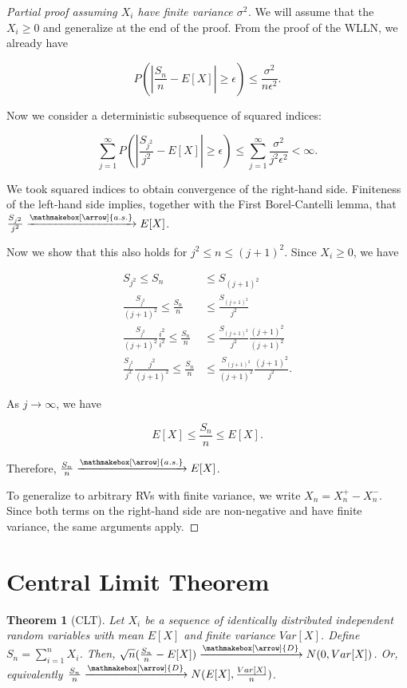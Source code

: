 \documentclass{book}
\theoremstyle{plain}%
\newtheorem{theorem}{Theorem}[section]
\theoremstyle{definition}
\newlength{\arrow}
\newcommand*{\myrightarrow}[1]{\xrightarrow{\mathmakebox[\arrow]{#1}}}
\begin{document}
\begin{proof}[Partial proof assuming $X_i$ have finite variance $\sigma^2$] We will assume that the $X_i \geq 0$ and generalize at the end of the proof. From the proof of the WLLN, we already have

$$P(|\frac{S_n}{n} - E[X]| \geq \epsilon) \leq  \frac{\sigma^2}{n\epsilon^2}.$$

Now we consider a deterministic subsequence of squared indices:

$$\sum_{j=1}^\infty P(|\frac{S_{j^2}}{j^2} - E[X]| \geq \epsilon) \leq  \sum_{j=1}^\infty \frac{\sigma^2}{j^2\epsilon^2} < \infty.$$

We took squared indices to obtain convergence of the right-hand side. Finiteness of the left-hand side implies, together with the First Borel-Cantelli lemma, that $\frac{S_{j^2}}{j^2} \myrightarrow{a.s.} E[X]$.

Now we show that this also holds for $j^2 \leq n \leq (j + 1)^2$. Since $X_i \geq 0$, we have 

\begin{align*}
S_{j^2} \leq S_n &\leq S_{(j+1)^2}\\
\frac{S_{j^2}}{(j + 1)^2} \leq \frac{S_n}{n} &\leq \frac{S_{(j+1)^2}}{j^2}\\
\frac{S_{j^2}}{(j + 1)^2}\frac{i^2}{i^2} \leq \frac{S_n}{n} &\leq \frac{S_{(j+1)^2}}{j^2}\frac{(j + 1)^2}{(j + 1)^2}\\
\frac{S_{j^2}}{j^2}\frac{j^2}{(j + 1)^2} \leq
\frac{S_n}{n} &\leq \frac{S_{(j+1)^2}}{(j + 1)^2}\frac{(j + 1)^2}{j^2}.
\end{align*}

As $j \rightarrow \infty$, we have

$$E[X] \leq \frac{S_n}{n} \leq E[X].$$

Therefore, $\frac{S_n}{n} \myrightarrow{a.s.} E[X]$.

To generalize to arbitrary RVs with finite variance, we write $X_n = X^+_n - X^-_n$. Since both terms on the right-hand side are non-negative and have finite variance, the same arguments apply.


\end{proof}

\section{Central Limit Theorem}

\begin{theorem}[CLT]
Let ${X_i}$ be a sequence of identically distributed independent random variables with mean $E[X]$ and finite variance $Var[X]$. Define $S_n = \sum_{i=1}^n X_i$. Then, $\sqrt{n}(\frac{S_n}{n} - E[X]) \myrightarrow{D} N(0,Var[X])$. Or, equivalently $\frac{S_n}{n} \myrightarrow{D} N(E[X],\frac{Var[X]}{n})$.
\end{theorem}
\end{document}
